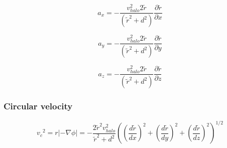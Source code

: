 \begin{equation}
a_x = - \dfrac{v_{halo}^2 2 \tilde{r}}{(\tilde{r}^2 + d^2)} \dfrac{\partial \tilde{r}}{\partial x}
\end{equation}

\begin{equation}
a_y = - \dfrac{v_{halo}^2 2 \tilde{r}}{(\tilde{r}^2 + d^2)} \dfrac{\partial \tilde{r}}{\partial y}
\end{equation}

\begin{equation}
a_z = - \dfrac{v_{halo}^2 2 \tilde{r}}{(\tilde{r}^2 + d^2)} \dfrac{\partial \tilde{r}}{\partial z}
\end{equation}

\subsubsection{Circular velocity}

\begin{equation}
{v_c}^2 = r|-\nabla \phi|  = - \dfrac{2 \tilde{r}^2 v_{halo}^2}{\tilde{r}^2  + d^2} \left( \left( \dfrac{d\tilde{r} }{dx}\right)^2 + \left( \dfrac{d\tilde{r} }{dy}\right)^2 + \left( \dfrac{d\tilde{r} }{dz}\right)^2  \right)^{1/2} 
\end{equation}




